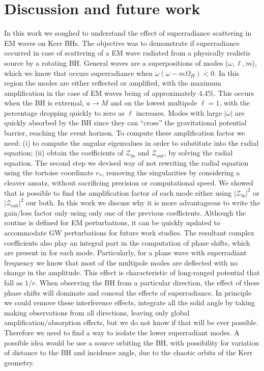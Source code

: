 
\chapter{Discussion and future work} %
\label{Chapter6}

In this work we soughed to understand the effect of superradiance scattering in EM waves on Kerr BHs.
The objective was to demonstrate if superradiance occurred in case of scattering of a EM wave radiated from a physically realistic source by a rotating BH.
General waves are a superpositions of modes ($\omega, \ell, m$), which we know that occurs superradiance when $\omega(\omega - m \Omega_H)<0$.
In this region the modes are either reflected or amplified, with the maximum amplification in the case of EM waves being of approximately 4.4\%.
This occurs when the BH is extremal, $a\to M$ and on the lowest multipole $\ell=1$, with the percentage dropping quickly to zero as $\ell$ increases.
Modes with large $|\omega|$ are quickly absorbed by the BH since they can ``cross'' the gravitational potential barrier, reaching the event horizon.
To compute these amplification factor we need: (i) to compute the angular eigenvalues in order to substitute into the radial equation; (ii) obtain the coefficients of $\mathscr{Z}_\mathrm{in}$ and $\mathscr{Z}_\mathrm{out}$, by solving the radial equation.
The second step we devised way of not rewriting the radial equation using the tortoise coordinate $r_*$, removing the singularities by considering a cleaver ansatz, without sacrificing precision or computational speed.
We showed that is possible to find the amplification factor of each mode either using $|\mathscr{Z}_\mathrm{in}|^2$ or $|\mathscr{Z}_\mathrm{out}|^2$ our both.
In this work we discuss why it is more advantageous to write the gain/loss factor only using only one of the previous coefficients.
Although the routine is defined for EM perturbations, it can be quickly updated to accommodate GW perturbations for future work studies.
The resultant complex coefficients also play an integral part in the computation of phase shifts, which are present in for each mode.
Particularly, for a plane wave with superradiant frequency we know that most of the multipole modes are deflected with no change in the amplitude.
This effect is characteristic of long-ranged potential that fall as $1/r$.
When observing the BH from a particular direction, the effect of these phase shifts will dominate and conceal the effects of superradiance.
In principle we could remove these interference effects, integrate all the solid angle by taking making observations from all directions, leaving only global amplification/absorption effects, but we do not know if that will be ever possible.
Therefore we need to find a way to isolate the lower superradiant modes. A possible idea would be use a source orbiting the BH, with possibility for variation of distance to the BH and incidence angle, due to the chaotic orbits of the Kerr geometry. 